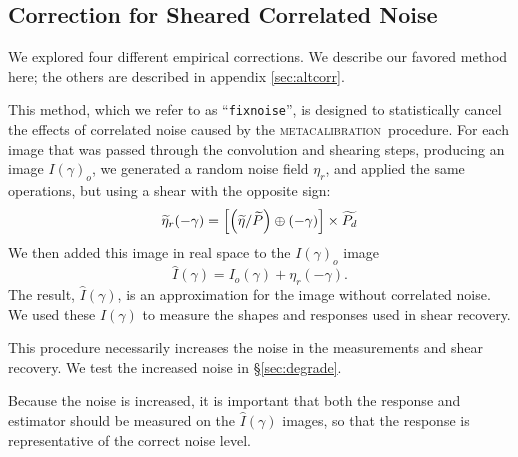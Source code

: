 \documentclass[iop]{emulateapj}
\newcommand{\mcal}{\textsc{metacalibration}}
\newcommand{\ntil}{\mbox{$\widetilde{\eta}$}}
\newcommand{\Ptil}{\mbox{$\widetilde{P}$}}
\newcommand{\Ptild}{\mbox{$\widetilde{P_d}$}}
\newcommand{\fixnoise}{\texttt{fixnoise}}
\begin{document}


\subsection{Correction for Sheared Correlated Noise} \label{sec:fixnoise}


We explored four different empirical corrections.  We describe our favored
method here; the others are described in appendix \ref{sec:altcorr}.

This method, which we refer to as ``\fixnoise'', is designed to statistically
cancel the effects of correlated noise caused by the \mcal\ procedure.  For each
image that was passed through the convolution and shearing steps, producing
an image $I(\gamma)_o$, we generated a random noise field
$\eta_r$, and applied the same operations, but using a shear with
the opposite sign:
\begin{equation}
    \widetilde{\eta}_r(-\gamma) = \left[ \left( \ntil/\Ptil \right) \oplus (-\gamma) \right] \times \Ptild  \nonumber \\
\end{equation}
We then added this image in real space to the $I(\gamma)_o$ image
\begin{equation}
    \hat{I}(\gamma) = I_o(\gamma) + \eta_r(-\gamma).
\end{equation}
The result, $\hat{I}(\gamma)$, is an approximation for the image
without correlated noise.
We used these $\hat{I}(\gamma)$ to measure the shapes and responses used in
shear recovery.  

This procedure necessarily increases the noise in the measurements and shear
recovery.  We test the increased noise in \S \ref{sec:degrade}.


Because the noise is increased, it is important that both the response and
estimator should be measured on the $\hat{I}(\gamma)$ images, so that the
response is representative of the correct noise level.
\end{document}
